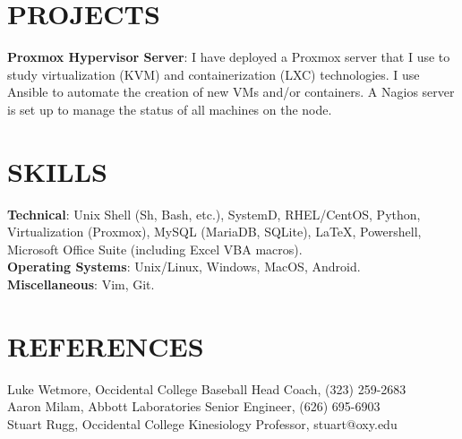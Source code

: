 \documentclass[margin]{res}
\begin{document}
\begin{resume}
\section{PROJECTS}
\par
\textbf{Proxmox Hypervisor Server}:
I have deployed a Proxmox server that I use to study virtualization (KVM) and containerization (LXC) technologies. I use Ansible to automate the creation of new VMs and/or containers. A Nagios server is set up to manage the status of all machines on the node.

\section{SKILLS}

\textbf{Technical}: Unix Shell (Sh, Bash, etc.), SystemD, RHEL/CentOS, Python, Virtualization (Proxmox), MySQL (MariaDB, SQLite), \LaTeX, Powershell, Microsoft Office Suite (including Excel VBA macros).
\\
\textbf{Operating Systems}: Unix/Linux, Windows, MacOS, Android.
\\
\textbf{Miscellaneous}: Vim, Git.

\section{REFERENCES}
Luke Wetmore, Occidental College Baseball Head Coach, (323) 259-2683 \\
Aaron Milam, Abbott Laboratories Senior Engineer, (626) 695-6903 \\
Stuart Rugg, Occidental College Kinesiology Professor, stuart@oxy.edu
\end{resume}
\end{document}
